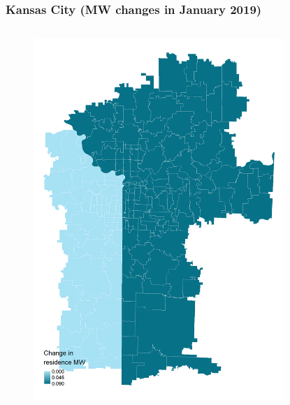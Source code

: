 \documentclass[aspectratio=169, t]{beamer}
\begin{document}
\begin{frame}[label = kc_example]
\frametitle{Kansas City (MW changes in January 2019)}
    \begin{columns}
        \begin{column}{0.50\textwidth}
            \vspace{-4mm}
            \begin{figure}
                \centering
                \includegraphics[scale = 0.3]{maps_events/output/kc_2018-12_statutory_mw.png}
            \end{figure}   
        \end{column}
        \begin{column}{0.50\textwidth}
            \vspace{-4mm}
            \begin{figure}
                \centering

\end{figure}
\end{column}
\end{columns}
\end{frame}
\end{document}
